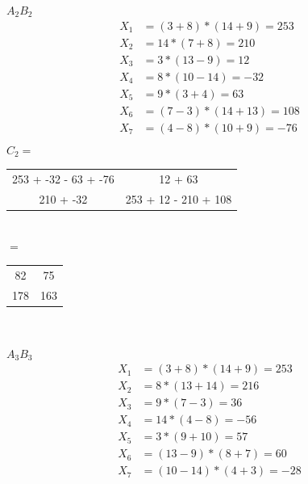 \documentclass{article}
\begin{document}
\begin{enumerate}
\begin{multicols}{2}
        \begin{center}
            $A_2B_2$\\
            \begin{align*}
                X_1 &= (3 + 8) * (14 + 9) = 253\\
                X_2 &= 14 * (7 + 8) = 210\\
                X_3 &= 3 * (13-9) = 12 \\
                X_4 &= 8 * (10 - 14) = -32\\
                X_5 &= 9 * (3 + 4) = 63 \\
                X_6 &= (7 - 3) * (14 + 13) = 108\\
                X_7 &= (4 - 8) * (10 + 9) = -76\\
            \end{align*}
            $C_2=$
            \begin{tabular}{|c c|}
                \hline
                253 + -32 - 63 + -76 &12 + 63\\
                210 + -32& 253 + 12 - 210 + 108\\
                \hline
            \end{tabular}\\
            $=$
            \begin{tabular}{|c c|}
                \hline
                82&75\\
                178&163\\
                \hline
            \end{tabular}\\
        \end{center}
    \end{multicols}
    \pagebreak
    \begin{multicols}{2}
        \begin{center}
            $A_3B_3$\\
            \begin{align*}
                X_1 &= (3 + 8) * (14 + 9)  = 253\\
                X_2 &= 8 * (13 + 14) = 216\\
                X_3 &= 9 * (7 -3) = 36 \\
                X_4 &= 14 * (4 - 8) = -56\\
                X_5 &= 3 * (9 + 10) = 57\\
                X_6 &= (13 - 9) * (8 + 7) = 60\\
                X_7 &= (10 - 14) * (4 + 3) = -28\\

\end{align*}
\end{center}
\end{multicols}
\end{enumerate}
\end{document}
